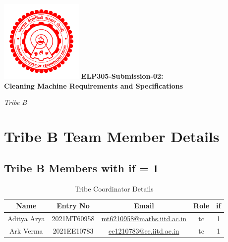 \documentclass[12pt]{article} %
\begin{document}
\begin{titlepage}
\thispagestyle{empty}
\centering
\includegraphics[width=0.3\textwidth]{logo.png}
\vfill
\centering
\vspace{10pt}
{\huge\textbf{ELP305-Submission-02:\\ Cleaning Machine Requirements and Specifications}}



\vspace{1cm}
\Huge\textbf{}
\vspace{1cm}
\vfill
\huge\textit{Tribe B}
\end{titlepage}



\clearpage
\section*{Tribe B Team Member Details}
\subsection{Tribe B Members with  \acrshort{if} = 1}
\begin{table}[h!]
\centering

\begin{tabular}{|c|c|c|c|c|}
\hline
Name & Entry No & Email & Role & \acrshort{if} \\
\hline
Aditya Arya & 2021MT60958 & \href{mailto:mt6210958@maths.iitd.ac.in}{mt6210958@maths.iitd.ac.in} & \acrshort{tc} & 1 \\
Ark Verma & 2021EE10783 & \href{mailto:ee1210783@ee.iitd.ac.in}{ee1210783@ee.iitd.ac.in} & \acrshort{tc} & 1 \\
\hline
\end{tabular}
\caption{Tribe Coordinator Details}
\label{tab:teamDetails}
\end{table}
\end{document}
